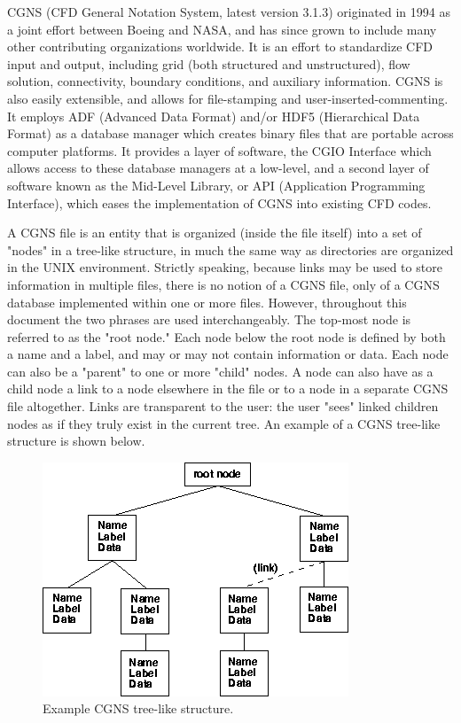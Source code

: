 CGNS (CFD General Notation System, latest version 3.1.3) originated in 1994 as
a joint effort between Boeing and NASA, and has since grown to include many
other contributing organizations worldwide. It is an effort to standardize CFD
input and output, including grid (both structured and unstructured), flow
solution, connectivity, boundary conditions, and auxiliary information. CGNS
is also easily extensible, and allows for file-stamping and
user-inserted-commenting. It employs ADF (Advanced Data Format) and/or HDF5
(Hierarchical Data Format) as a database manager which creates binary files
that are portable across computer platforms. It provides a layer of software,
the CGIO Interface which allows access to these database managers at a
low-level, and a second layer of software known as the Mid-Level Library, or
API (Application Programming Interface), which eases the implementation of
CGNS into existing CFD codes.

A CGNS file is an entity that is organized (inside the file itself) into a set
of "nodes" in a tree-like structure, in much the same way as directories are
organized in the UNIX environment.  Strictly speaking, because links may be
used to store information in multiple files, there is no notion of a CGNS
file, only of a CGNS database implemented within one or more files.  However,
throughout this document the two phrases are used interchangeably. The top-most
node is referred to as the "root node." Each node below the root node is
defined by both a name and a label, and may or may not contain information or
data. Each node can also be a "parent" to one or more "child" nodes.  A node
can also have as a child node a link to a node elsewhere in the file or to a
node in a separate CGNS file altogether. Links are transparent to the user:
the user "sees" linked children nodes as if they truly exist in the current
tree. An example of a CGNS tree-like structure is shown below.

\begin{figure} [ht]
\centering
\includegraphics[scale=0.5]{graphics/cgns.png}
\caption{Example CGNS tree-like structure.}
\end{figure}

